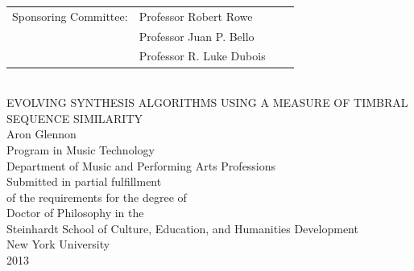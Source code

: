 \documentclass[a4paper,12pt]{report} 	%
\numberwithin{figure}{chapter}
\numberwithin{table}{chapter}
\numberwithin{equation}{chapter}
\begin{document}
\begin{titlepage}
\begin{center}
\begin{tabular}{llll}
  Sponsoring Committee: & Professor Robert Rowe\\
  & Professor Juan P. Bello\\
  & Professor R. Luke Dubois\\
\end{tabular}
\\
\vfill
EVOLVING SYNTHESIS ALGORITHMS USING A MEASURE OF TIMBRAL SEQUENCE SIMILARITY\\
\vfill
Aron Glennon\\
Program in Music Technology\\
Department of Music and Performing Arts Professions\\
\vfill
Submitted in partial fulfillment\\
of the requirements for the degree of\\
Doctor of Philosophy in the\\
Steinhardt School of Culture, Education, and Humanities Development\\
New York University\\
2013\\
\end{center}
\end{titlepage}

\newpage
\end{document}
